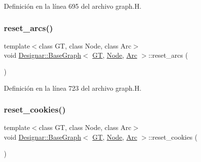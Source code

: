 Definición en la línea 695 del archivo graph.\+H.

\mbox{\label{class_designar_1_1_base_graph_a6dc66191c2d752bf7f67a4522a7830e3}} 
\subsubsection{\texorpdfstring{reset\+\_\+arcs()}{reset\_arcs()}}
{\footnotesize\ttfamily template$<$class GT, class Node, class Arc$>$ \\
void \hyperlink{class_designar_1_1_base_graph}{Designar\+::\+Base\+Graph}$<$ \hyperlink{demo-buildgraph_8_c_a3001c40d2c31ca87ed96cd7d1334a55e}{GT}, \hyperlink{namespace_designar_a5af326c65aa2bd26b26c410f2030d09e}{Node}, \hyperlink{namespace_designar_a3f55fb5513d62ff47cbc8f72b8e95d6f}{Arc} $>$\+::reset\+\_\+arcs (\begin{DoxyParamCaption}{ }\end{DoxyParamCaption})\hspace{0.3cm}{\ttfamily [inline]}}



Definición en la línea 723 del archivo graph.\+H.

\mbox{\label{class_designar_1_1_base_graph_a96a630fd589c34e7e6242f4349606e1c}} 
\subsubsection{\texorpdfstring{reset\+\_\+cookies()}{reset\_cookies()}}
{\footnotesize\ttfamily template$<$class GT, class Node, class Arc$>$ \\
void \hyperlink{class_designar_1_1_base_graph}{Designar\+::\+Base\+Graph}$<$ \hyperlink{demo-buildgraph_8_c_a3001c40d2c31ca87ed96cd7d1334a55e}{GT}, \hyperlink{namespace_designar_a5af326c65aa2bd26b26c410f2030d09e}{Node}, \hyperlink{namespace_designar_a3f55fb5513d62ff47cbc8f72b8e95d6f}{Arc} $>$\+::reset\+\_\+cookies (\begin{DoxyParamCaption}{ }\end{DoxyParamCaption})\hspace{0.3cm}{\ttfamily [inline]}}



